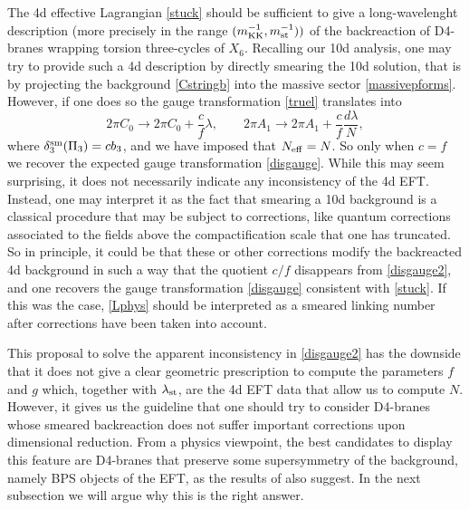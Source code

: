\documentclass[11pt]{article}
\def\be{\begin{equation}}
\def\ee{\end{equation}}
\begin{document}
The 4d effective Lagrangian \eqref{stuck} should be sufficient to give a long-wavelenght description (more precisely in the range $(m_{\rm KK}^{-1}, m_{\rm st}^{-1}))$ of the backreaction of D4-branes wrapping torsion three-cycles of $X_6$. Recalling our 10d analysis, one may try to provide such a 4d description by directly smearing the 10d solution, that is by projecting the background \eqref{Cstringb} into the massive sector \eqref{massivepforms}. However, if one does so the gauge transformation \eqref{truel} translates into
\be
2\pi C_0 \to 2\pi C_0 + \frac{c}{f} \lambda , \qquad 2\pi A_1 \to  2\pi A_1 + \frac{c}{f}  \frac{d\lambda}{N} ,
\label{disgauge2}
\ee
where $\delta_3^{\rm sm}(\Pi_3) = c b_3$, and we have imposed that $N_{\rm eff} = N$. So only when $c=f$ we recover the expected gauge transformation \eqref{disgauge}. While this may seem surprising, it does not necessarily indicate any inconsistency of the 4d EFT. Instead, one may interpret it as the fact that smearing a 10d background is a classical procedure that may be subject to corrections, like quantum corrections associated to the fields above the compactification scale that one has truncated.   So in principle, it could be that these or other corrections modify the backreacted 4d background in such a way that the quotient $c/f$ disappears from \eqref{disgauge2}, and one recovers the gauge transformation \eqref{disgauge} consistent with \eqref{stuck}. If this was the case, \eqref{Lphys} should be interpreted as a smeared linking number after corrections have been taken into account. 

This proposal to solve the apparent inconsistency in \eqref{disgauge2} has the downside that it does not give a clear geometric prescription to compute the parameters $f$ and $g$ which, together with $\lambda_{\rm st}$, are the 4d EFT data that allow us to compute $N$. However, it gives us the guideline that one should try to consider D4-branes whose smeared backreaction does not suffer important corrections upon dimensional reduction. From a physics viewpoint, the best candidates to display this feature are D4-branes that preserve some supersymmetry of the background, namely BPS objects of the EFT, as the results of \cite{Blaback:2010sj} also suggest. In the next subsection we will argue why this is the right answer. 
\end{document}
